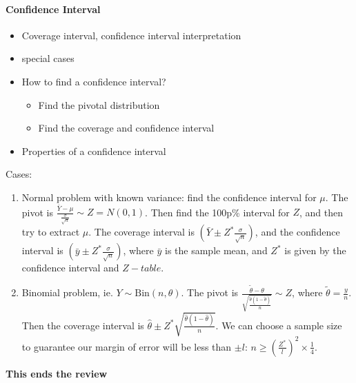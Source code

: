 \documentclass[10pt,letter]{article}
\theoremstyle{plain}
\theoremstyle{definition}
\begin{document}
\paragraph{Confidence Interval}
\begin{itemize}
    \item Coverage interval, confidence interval interpretation 
    \item special cases
    \item How to find a confidence interval? 
    \begin{itemize}
        \item Find the pivotal distribution 
        \item Find the coverage and confidence interval
    \end{itemize}
    \item Properties of a confidence interval
\end{itemize}
Cases:
\begin{enumerate}
    \item Normal problem with known variance: find the confidence interval for $\mu$. The pivot is $\frac{\bar{Y}-\mu}{\frac{\sigma}{\sqrt{n}}}\sim Z=N(0,1)$. Then find the 100p\% interval for $Z$, and then try to extract $\mu$. The coverage interval is $\left(\bar{Y}\pm Z^*\frac{\sigma}{\sqrt{n}}\right)$, and the confidence interval is $\left(\bar{y}\pm Z^*\frac{\sigma}{\sqrt{n}}\right)$, where $\bar{y}$ is the sample mean, and $Z^*$ is given by the confidence interval and $Z-table$. 
    \item Binomial problem, ie. $Y\sim\text{Bin}(n,\theta)$. The pivot is $\frac{\tilde{\theta}-\theta}{\sqrt{\frac{\tilde{\theta}(1-\tilde{\theta})}{n}}}\sim Z$, where $\tilde{\theta}=\frac{y}{n}$. Then the coverage interval is $\hat{\theta}\pm Z^*\sqrt{\frac{\hat{\theta}(1-\hat{\theta})}{n}}$. We can choose a sample size to guarantee our margin of error will be less than $\pm l$: $n\geq\left(\frac{Z^*}{l}\right)^2\times\frac{1}{4}$. 
\end{enumerate}
\textbf{This ends the review}
\end{document}
